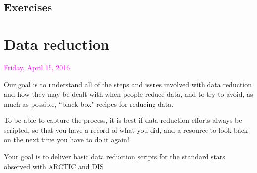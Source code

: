 \documentclass{article}
\begin{document}
\subsection*{Exercises}

\section*{Data reduction}
\textcolor{magenta}{Friday, April 15, 2016}

Our goal is to understand all of the steps and issues involved with
data reduction and how they may be dealt with when people reduce data,
and to try to avoid, as much as possible, ``black-box" recipes for
reducing data.

To be able to capture the process, it is best if data reduction
efforts always be scripted, so that you have a record of what you did,
and a resource to look back on the next time you have to do it again!

Your goal is to deliver basic data reduction scripts for the standard
stars observed with ARCTIC and DIS
\end{document}
